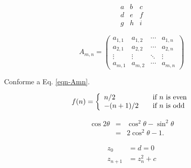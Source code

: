 \begin{frame}
\begin{LTXexample}
\begin{equation}
\begin{matrix}
  a & b & c \\
  d & e & f \\
  g & h & i
 \end{matrix}
\end{equation}
\end{LTXexample}

\begin{LTXexample}
\begin{equation}
\label{eqn-Amn}
 A_{m,n} =
 \begin{pmatrix}
  a_{1,1} & a_{1,2} & \cdots & a_{1,n} \\
  a_{2,1} & a_{2,2} & \cdots & a_{2,n} \\
  \vdots  & \vdots  & \ddots & \vdots  \\
  a_{m,1} & a_{m,2} & \cdots & a_{m,n}
 \end{pmatrix}
\end{equation}

Conforme a Eq. \ref{eqn-Amn}.
\end{LTXexample}

\begin{LTXexample}
\begin{equation}
f(n) = \left\{ 
\begin{array}{l l}
n/2 & \quad \text{if $n$ is even}\\
-(n+1)/2 & \quad \text{if $n$ is odd}\\
\end{array} \right.
\end{equation}
\end{LTXexample}

\begin{LTXexample}
\begin{eqnarray*}
\cos 2\theta & = & \cos^2 \theta - 
                   \sin^2 \theta \\
             & = & 2 \cos^2 \theta - 1.
\end{eqnarray*}
\end{LTXexample}

\begin{LTXexample}
\begin{align*}
  z_0 &= d = 0 \\
  z_{n+1} &= z_n^2+c
\end{align*}
\end{LTXexample}

\end{frame}


